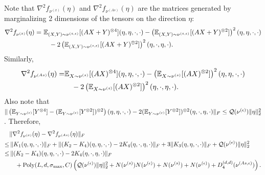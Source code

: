 Note that $\nabla^2f_{\nu^{(x)}}(\eta)$ and $\nabla^2f_{\nu^{(As)}}(\eta)$ are the matrices generated by marginalizing 2 dimensions of the tensors on the direction $\eta$:  
\begin{align*}
\nabla^2f_{\nu^{(x)}}(\eta) =\, &\, \mathbb{E}_{(X,Y)\sim \nu^{(s,\epsilon)}} [(AX+Y)^{\otimes 4}](\eta,\eta,\cdot,\cdot) - \left( \mathbb{E}_{(X,Y)\sim \nu^{(s,\epsilon)}} [(AX+Y)^{\otimes 2}]\right)^2 (\eta,\eta,\cdot,\cdot) \\
& \quad - 2\left( \mathbb{E}_{(X,Y)\sim \nu^{(s,\epsilon)}} [(AX+Y)^{\otimes 2}]\right)^2 (\eta,\cdot,\eta,\cdot).
\end{align*}
Similarly, 
\begin{align*}
\nabla^2f_{\nu^{(As)}}(\eta) = & \mathbb{E}_{X\sim \nu^{(s)}}[(AX)^{\otimes 4}](\eta,\eta,\cdot,\cdot) - \left(\mathbb{E}_{X\sim \nu^{(s)}}[(AX)^{\otimes 2}]\right)^2(\eta,\eta,\cdot,\cdot) \\
& \quad - 2 \left(\mathbb{E}_{X\sim \nu^{(s)}}[(AX)^{\otimes 2}]\right)^2(\eta,\cdot,\eta,\cdot). 
\end{align*}
Also note that  $\| \left(\mathbb{E}_{Y\sim \nu^{(\epsilon)}} [Y^{\otimes4}] - (\mathbb{E}_{Y\sim \nu^{(\epsilon)}} [Y^{\otimes2}])^{\otimes 2}\right)(\eta,\eta,\cdot,\cdot)  - 2 (\mathbb{E}_{Y\sim \nu^{(\epsilon)}} [Y^{\otimes2}])^{\otimes 2}(\eta,\cdot,\eta,\cdot)\|_F\le \mathcal{Q}(\nu^{(\epsilon)}) \|\eta\|_2^2$.
Therefore,
\begin{align*}
& \|\nabla^2f_{\nu^{(x)}}(\eta) -  \nabla^2f_{\nu^{(As)}}(\eta) \|_F \\
\le &\, \|K_1(\eta,\eta,\cdot, \cdot)\|_F + \|(K_2-K_4)(\eta,\eta,\cdot, \cdot) - 2K_4(\eta,\cdot,\eta,\cdot)\|_F + 3 \|K_3(\eta,\eta,\cdot, \cdot)\|_F + \mathcal{Q}(\nu^{(\epsilon)}) \|\eta\|_2^2\\
\le &\, \|(K_2-K_4)(\eta,\eta,\cdot, \cdot) - 2K_4(\eta,\cdot,\eta,\cdot)\|_F \\
& \quad + \text{Poly}(L, d, \sigma_{\max}, C)\left(\mathcal{Q}(\nu^{(\epsilon)}) \|\eta\|_2^2+ N(\nu^{(s)})N(\nu^{(\epsilon)}) + N(\nu^{(s)})+ N(\nu^{(\epsilon)})+ D_4^{(d,d)}(\nu^{(As,\epsilon)}) \right) .
\end{align*}

